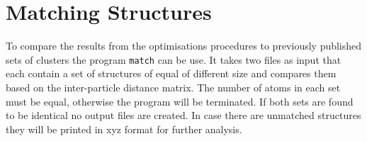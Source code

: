 \section{Matching Structures}
\label{sec:matchingstructures}

To compare the results from the optimisations procedures to previously
published sets of clusters the program \verb|match| can be use. It takes two
files as input that each contain a set of structures of equal of different size
and compares them based on the inter-particle distance matrix. The number of
atoms in each set must be equal, otherwise the program will be terminated. If
both sets are found to be identical no output files are created. In case there
are unmatched structures they will be printed in xyz format for further
analysis.

